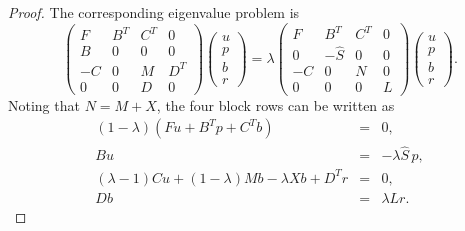 \documentclass{siamltex}
\begin{document}
\begin{proof}
The corresponding eigenvalue problem is
 \begin{equation*}
\left(
\begin{array}{cccc}
F & B^T & C^T & 0\\
B & 0 & 0& 0\\
-C & 0& M & D^T\\
0 & 0 & D & 0
\end{array}
\right)
\left(
\begin{array}{c}
u\\
p\\
b\\
r
\end{array}
\right)
=
\lambda \left(
\begin{array}{cccc}
F & B^T &C^T & 0\\
0 & -\widehat{S} & 0 & 0\\
-C &0 & N & 0\\
0 & 0 &  0 & L
\end{array}
\right)
\left(
\begin{array}{c}
u\\
p\\
b\\
r
\end{array}
\right).
\end{equation*}
Noting that $N=M+X$, the four block rows can be written as
\begin{eqnarray}
\label{eq:outer_row1} (1-\lambda) (Fu + B^T p+ C^T b) &=& 0,\\
\label{eq:outer_row2} B u &=& -\lambda \widehat{S}\, p,\\
\label{eq:outer_row3} (\lambda -1) C u + (1 - \lambda) M b - \lambda X b + D^T r &=& 0,\\
\label{eq:outer_row4} D b &=& \lambda L r.
\end{eqnarray}


\end{proof}
\end{document}
